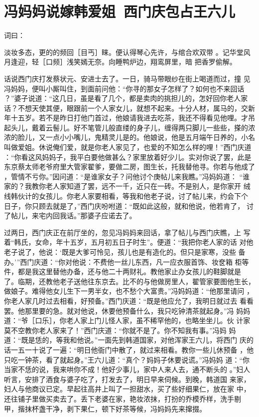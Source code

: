 \chapter{冯妈妈说嫁韩爱姐~西门庆包占王六儿}

词曰：

淡妆多态，更的的频回［目丐］睐。便认得琴心先许，与绾合欢双带
。记华堂风月逢迎，轻［口频］浅笑嫣无奈。向睡鸭炉边，翔鸾屏里，暗
把香罗偷解。

话说西门庆打发蔡状元、安进士去了。一日，骑马带眼纱在街上喝道而过，撞
见冯妈妈，便叫小厮叫住，到面前问他：“你寻的那女子怎样了？如何也不来回话
？”婆子说道：“这几日，虽是看了几个，都是卖肉的挑担儿的，怎好回你老人家
话？不想天使其便，眼跟前一个人家女儿，就想不起来。十分人材，属马的，交新
年十五岁。若不是昨日打他门首过，他娘请我进去吃茶，我还不得看见他哩。才吊
起头儿，戴着云髻儿。好不笔管儿般直缕的身子儿，缠得两只脚儿一些些，搽的浓
浓的脸儿，又一点小小嘴儿，鬼精灵儿是的。他娘说，他是五月端午日养的，小名
叫做爱姐。休说俺们爱，就是你老人家见了，也爱的不知怎么样的哩！”西门庆道
：“你看这风妈妈子，我平白要他做甚么？家里放着好少儿。实对你说了罢，此是
东京蔡太师老爷府里大管家翟爹，要做二房，图生长，托我替他寻。你若与他成了
，管情不亏你。”因问道：“是谁家女子？问他讨个庚帖儿来我瞧。”冯妈妈道：
“谁家的？我教你老人家知道了罢，远不一千，近只在一砖。不是别人，是你家开
绒线韩伙计的女孩儿。你老人家要相看，等我和他老子说，讨了帖儿来，约会下个
日子，你只顾去就是了，”西门庆吩咐道：“既如此这般，就和他说，他若肯了，
讨了帖儿，来宅内回我话。”那婆子应诺去了。

过两日，西门庆正在前厅坐的，忽见冯妈妈来回话，拿了帖儿与西门庆瞧，上
写着“韩氏，女命，年十五岁，五月初五日子时生”。便道：“我把你老人家的话
对他老子说了，他说：‘既是大爹可怜见，孩儿也是有造化的。但只是家寒，没些
备办。’”西门庆道：“你对他说：不费他一丝儿东西，凡一应衣服首饰、妆奁箱
柜等件，都是我这里替他办备，还与他二十两财礼。教他家止办女孩儿的鞋脚就是
了。临期，还教他老子送他往东京去。比不的与他做房里人，翟管家要图他生长，
做娘子。难得他女儿生下一男半女，也不愁个大富贵。”冯妈妈道：“他那里请问
，你老人家几时过去相看，好预备。”西门庆道：“既是他应允了，我明日就过去
看看罢。他那里要的急。就对他说，休要他预备什么，我只吃钟清茶就起身。”冯
妈妈道：“爷［口乐］，你老人家上门儿怪人家，虽不稀罕他的，也略坐坐儿。伙
计家莫不空教你老人家来了！”西门庆道：“你就不是了。你不知我有事。”冯妈
妈道：“既是恁的，等我和他说。”一面先到韩道国家，对他浑家王六儿，将西门
庆的话一五一十说了一遍：“明日他衙门中散了，就过来相看。教你一些儿休预备
，他只吃一钟茶，看了就起身。”王六儿道：“真个？妈妈子休要说谎。”冯妈妈
道：“你当家不恁的说，我来哄你不成！他好少事儿，家中人来人去，通不断头的
。”妇人听言，安排了酒食与婆子吃了，打发去了，明日早来伺候。到晚，韩道国
来家，妇人与他商议已定。早起往高井上叫了一担甜水，买了些好细果仁，放在家
中，还往铺子里做买卖去了。丢下老婆在家，艳妆浓抹，打扮的乔模乔样，洗手剔
甲，揩抹杯盏干净，剥下果仁，顿下好茶等候，冯妈妈先来撺掇。

